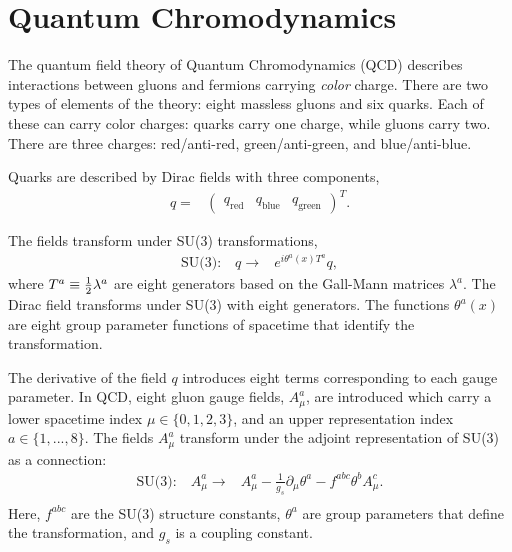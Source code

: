 \section{Quantum Chromodynamics}\label{sec:thyQCD}

The quantum field theory of Quantum Chromodynamics (QCD) describes interactions between gluons and fermions carrying \emph{color} charge.
There are two types of elements of the theory: eight massless gluons and six quarks.
Each of these can carry color charges: quarks carry one charge, while gluons carry two.
There are three charges: red/anti-red, green/anti-green, and blue/anti-blue.

Quarks are described by Dirac fields with three components,
\begin{equation}\begin{split}
    q=&\begin{pmatrix}q_\text{red}&q_\text{blue}&q_\text{green}\end{pmatrix}^T.
\end{split}\end{equation}

The fields transform under SU(3) transformations,
\begin{equation}\begin{split}
    \text{SU(3):}\quad q\to&e^{i\theta^a(x)T^a}q,
\end{split}\end{equation}
where $T^a\equiv\frac{1}{2}\lambda^a$ are eight generators based on the Gall-Mann matrices $\lambda^a$.
The Dirac field transforms under SU(3) with eight generators.
The functions $\theta^a(x)$ are eight group parameter functions of spacetime that identify the transformation.

The derivative of the field $q$ introduces eight terms corresponding to each gauge parameter.
In QCD, eight gluon gauge fields, $A_\mu^a$, are introduced which carry a lower spacetime index $\mu\in\{0,1,2,3\}$, and an upper representation index $a\in\{1,...,8\}$.
The fields $A_\mu^a$ transform under the adjoint representation of SU(3) as a connection:
\begin{equation}\begin{split}
    \text{SU(3):}\quad A_\mu^a\to&A_\mu^a-\frac{1}{g_s}\partial_\mu\theta^a-f^{abc}\theta^bA^c_\mu. \\
\end{split}\end{equation}
Here, $f^{abc}$ are the SU(3) structure constants, $\theta^a$ are group parameters that define the transformation, and $g_s$ is a coupling constant.

